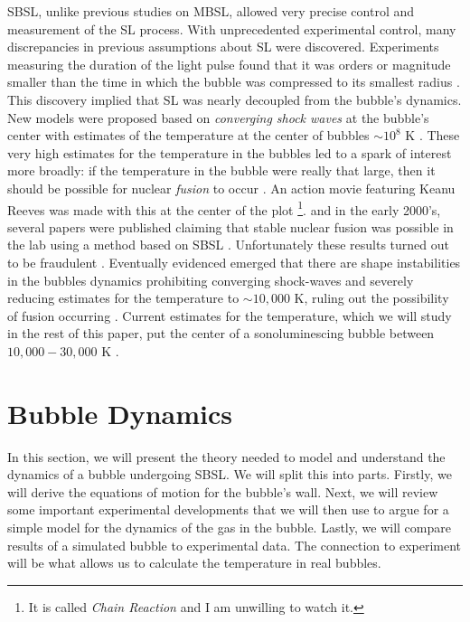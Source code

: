 \documentclass[prb,aps,nofootinbib,superscriptaddress,floatfix]{revtex4-2}
\begin{document}
SBSL, unlike previous studies on MBSL, allowed very precise control and measurement of the SL process. With unprecedented experimental control, many discrepancies in previous assumptions about SL were discovered. Experiments measuring the duration of the light pulse found that it was orders or magnitude smaller than the time in which the bubble was compressed to its smallest radius \cite{barber1992resolving,barber1991observation}. This discovery implied that SL was nearly decoupled from the bubble's dynamics. New models were proposed based on \emph{converging shock waves} at the bubble's center with estimates of the temperature at the center of bubbles $\sim10^8$ K \cite{wu1993shock,greenspan1993sonoluminescence}. These very high estimates for the temperature in the bubbles led to a spark of interest more broadly: if the temperature in the bubble were really that large, then it should be possible for nuclear \emph{fusion} to occur \cite{}. An action movie featuring Keanu Reeves was made with this at the center of the plot \footnote{It is called \emph{Chain Reaction} and I am unwilling to watch it.}. and in the early 2000's, several papers were published claiming that stable nuclear fusion was possible in the lab using a method based on SBSL \cite{}. Unfortunately these results turned out to be fraudulent \cite{}. Eventually evidenced emerged that there are shape instabilities in the bubbles dynamics prohibiting converging shock-waves and severely reducing estimates for the temperature to $\sim 10,000$ K, ruling out the possibility of fusion occurring \cite{brenner2002single}. Current estimates for the temperature, which we will study in the rest of this paper, put the center of a sonoluminescing bubble between $10,000-30,000$ K \cite{flannigan2005plasma,suslick2008inside,yasui2018acoustic,an2009diagnosing,an2008spectral,an2006mechanism}.

\section{Bubble Dynamics}
In this section, we will present the theory needed to model and understand the dynamics of a bubble undergoing SBSL. We will split this into parts. Firstly, we will derive the equations of motion for the bubble's wall. Next, we will review some important experimental developments that we will then use to argue for a simple model for the dynamics of the gas in the bubble. Lastly, we will compare results of a simulated bubble to experimental data. The connection to experiment will be what allows us to calculate the temperature in real bubbles.
\end{document}
